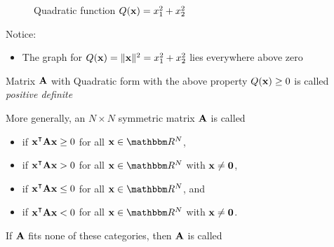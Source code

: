 \begin{frame}
    
    \vspace{2em}
    \begin{figure}
   \begin{center}
    \caption{\label{f:qform_pd} Quadratic function $Q({\mathbf x}) = x_1^2 + x_2^2$ }
   \end{center}
    \end{figure}

\end{frame}

\begin{frame}

    \vspace{2em}
    Notice:
    \begin{itemize}
        \item The graph for $Q({\mathbf x}) = \| {\mathbf x} \|^2 = x_1^2 + x_2^2$ lies everywhere above zero
    \end{itemize}
    
    \vspace{.7em}
    Matrix $\mathbf A$ with Quadratic form with the above property $Q({\mathbf x}) \geq 0$  is called \emph{positive definite}
    
\end{frame}

\begin{frame}

    \vspace{2em}
    More generally, an $N \times N$ symmetric matrix $\mathbf A$ is called
    \begin{itemize}
        \item {} if $\boldx^\T \boldA \boldx \geq 0$
            for all $\boldx \in \RR^N$, 
        \item {} if $\boldx^\T \boldA \boldx > 0$ for all $\boldx
            \in \RR^N$ with ${\mathbf x} \not= {\mathbf 0}$,
        \item {} if $\boldx^\T \boldA \boldx \leq 0$
            for all $\boldx \in \RR^N$, and
        \item {} if $\boldx^\T \boldA \boldx < 0$ for all $\boldx
            \in \RR^N$ with ${\mathbf x} \not= {\mathbf 0}$.
    \end{itemize}
    
    \vspace{.7em}
    If $\mathbf A$ fits none of these categories, then $\mathbf A$ is called 
    
\end{frame}

